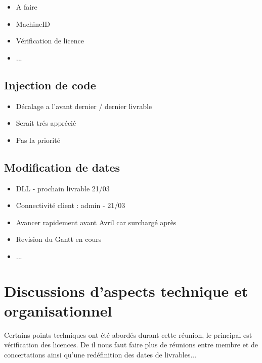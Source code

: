 \documentclass{article}
\begin{document}
\begin{itemize}
    \item A faire 
    \item MachineID
    \item Vérification de licence
    \item ...
\end{itemize}

\subsection{Injection de code}

\begin{itemize}
    \item Décalage a l'avant dernier / dernier livrable
    \item Serait trés apprécié
    \item Pas la priorité
\end{itemize}

\subsection{Modification de dates}

\begin{itemize}
    \item DLL - prochain livrable 21/03
    \item Connectivité client : admin - 21/03
    \item Avancer rapidement avant Avril car surchargé après
    \item Revision du Gantt en cours
    \item ...
\end{itemize}


\section{Discussions d'aspects technique et organisationnel}
Certains points techniques ont été abordés durant cette réunion, le principal est vérification des licences. De il nous faut faire plus de réunions entre membre et de concertations ainsi qu'une redéfinition des dates de livrables...  

\newpage
\end{document}
